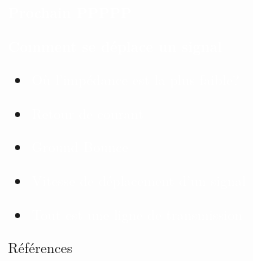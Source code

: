 







\titlebackground
\thankyouframe


\introbackground
\begin{frame}
    \centering
    \Large

    \textcolor{white}{\LARGE{\textbf{Prochain PPPPP}}}\\
    \vspace{24pt}

    \textcolor{white}{
    \LARGE{\textbf{Comment se déplace un signal}}}\\

    \begin{itemize}
        \item \textcolor{white}{Où l'impédance est la plus faible?}
        \item \textcolor{white}{Retour de courant}
        \item \textcolor{white}{Ground Bounce}
        \item \textcolor{white}{Vitesse de déplacement d'un signal}
        \item \textcolor{white}{Tout est une ligne de transmission}
    \end{itemize}
\end{frame}

\begin{frame}[allowframebreaks]{Références}
    \printbibliography
\end{frame}





